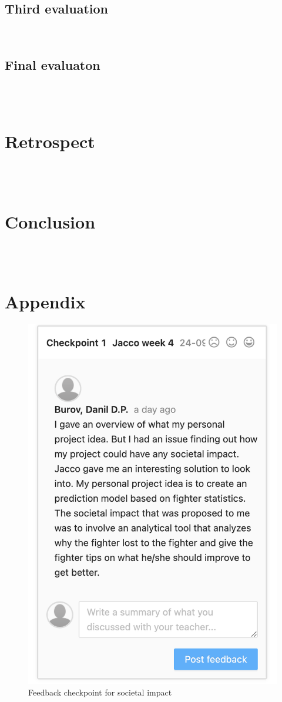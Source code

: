 \documentclass{article}
\begin{document}
\subsection{Third evaluation}\\
\subsection{Final evaluaton}\\\\

\section{Retrospect}\\\\ %
\section{Conclusion}\\\\ %
\section{Appendix}

\begin{figure}[h]
  \centering
  \includegraphics{images/Feedback_Societal_Impact.png}
  \caption{Feedback checkpoint for societal impact}
  \label{fig:appendix_image1}
\end{figure}
\end{document}
